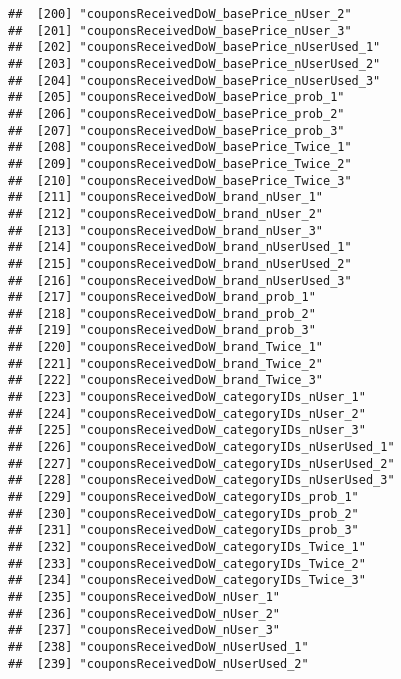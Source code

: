 \documentclass[10pt]{report}
\begin{document}
\begin{verbatim}
##  [200] "couponsReceivedDoW_basePrice_nUser_2"                 
##  [201] "couponsReceivedDoW_basePrice_nUser_3"                 
##  [202] "couponsReceivedDoW_basePrice_nUserUsed_1"             
##  [203] "couponsReceivedDoW_basePrice_nUserUsed_2"             
##  [204] "couponsReceivedDoW_basePrice_nUserUsed_3"             
##  [205] "couponsReceivedDoW_basePrice_prob_1"                  
##  [206] "couponsReceivedDoW_basePrice_prob_2"                  
##  [207] "couponsReceivedDoW_basePrice_prob_3"                  
##  [208] "couponsReceivedDoW_basePrice_Twice_1"                 
##  [209] "couponsReceivedDoW_basePrice_Twice_2"                 
##  [210] "couponsReceivedDoW_basePrice_Twice_3"                 
##  [211] "couponsReceivedDoW_brand_nUser_1"                     
##  [212] "couponsReceivedDoW_brand_nUser_2"                     
##  [213] "couponsReceivedDoW_brand_nUser_3"                     
##  [214] "couponsReceivedDoW_brand_nUserUsed_1"                 
##  [215] "couponsReceivedDoW_brand_nUserUsed_2"                 
##  [216] "couponsReceivedDoW_brand_nUserUsed_3"                 
##  [217] "couponsReceivedDoW_brand_prob_1"                      
##  [218] "couponsReceivedDoW_brand_prob_2"                      
##  [219] "couponsReceivedDoW_brand_prob_3"                      
##  [220] "couponsReceivedDoW_brand_Twice_1"                     
##  [221] "couponsReceivedDoW_brand_Twice_2"                     
##  [222] "couponsReceivedDoW_brand_Twice_3"                     
##  [223] "couponsReceivedDoW_categoryIDs_nUser_1"               
##  [224] "couponsReceivedDoW_categoryIDs_nUser_2"               
##  [225] "couponsReceivedDoW_categoryIDs_nUser_3"               
##  [226] "couponsReceivedDoW_categoryIDs_nUserUsed_1"           
##  [227] "couponsReceivedDoW_categoryIDs_nUserUsed_2"           
##  [228] "couponsReceivedDoW_categoryIDs_nUserUsed_3"           
##  [229] "couponsReceivedDoW_categoryIDs_prob_1"                
##  [230] "couponsReceivedDoW_categoryIDs_prob_2"                
##  [231] "couponsReceivedDoW_categoryIDs_prob_3"                
##  [232] "couponsReceivedDoW_categoryIDs_Twice_1"               
##  [233] "couponsReceivedDoW_categoryIDs_Twice_2"               
##  [234] "couponsReceivedDoW_categoryIDs_Twice_3"               
##  [235] "couponsReceivedDoW_nUser_1"                           
##  [236] "couponsReceivedDoW_nUser_2"                           
##  [237] "couponsReceivedDoW_nUser_3"                           
##  [238] "couponsReceivedDoW_nUserUsed_1"                       
##  [239] "couponsReceivedDoW_nUserUsed_2"                       

\end{verbatim}
\end{document}
